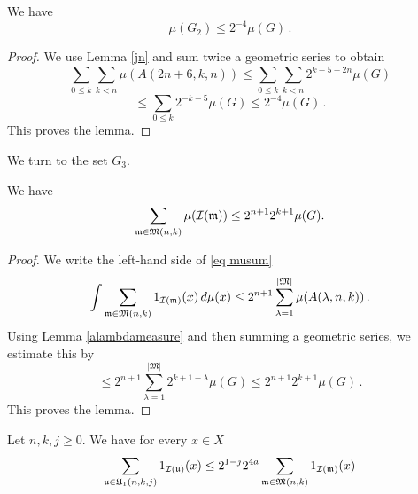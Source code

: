 \begin{lemma}\label{g2bound}
We have
\begin{equation}
    \mu(G_2)\le 2^{-4} \mu(G)\, .
\end{equation}
\end{lemma}
\begin{proof}

We use Lemma \ref{jn} and sum twice a geometric series
to obtain
\begin{equation}
    \sum_{0\le  k}\sum_{k< n}
\mu(A(2n+6,k,n))\le \sum_{0\le  k}\sum_{k< n} 2^{k-5-2n}\mu(G)
\end{equation}
\begin{equation}
    \le \sum_{0\le  k} 2^{-k-5}\mu(G)\le 2^{-4}\mu(G)\, .
\end{equation}
This proves the lemma.
\end{proof}


We turn to the set $G_3$.

\begin{lemma}\label{musumlemma}
    We have
    \begin{equation}\label{eq musum}
        \sum_{\mathfrak{m} \in \mathfrak{M}(n,k)} \mu(\sc(\mathfrak{m}))\le 2^{n+1}2^{k+1}\mu(G).
    \end{equation}
\end{lemma}
\begin{proof}
    We write the left-hand side of \ref{eq musum}
\begin{equation}
    \int \sum_{\mathfrak{m} \in \mathfrak{M}(n,k)} 1_{\sc(\mathfrak{m})}(x) \, d\mu(x) \le
2^{n+1} \sum_{\lambda=1}^{|\mathfrak{M}|}\mu(A(\lambda, n,k))\,.
\end{equation}
Using Lemma \ref{alambdameasure} and then summing a geometric series, we estimate this by
\begin{equation}
    \le
2^{n+1}\sum_{\lambda=1}^{|\mathfrak{M}|}
2^{k+1-\lambda}\mu(G)
\le
2^{n+1}2^{k+1}\mu(G)\, .
\end{equation}
This proves the lemma.
\end{proof}


\begin{lemma}\label{countu}
Let $n,k,j\ge 0$. We have for every $x\in X$
\begin{equation}
    \sum_{\fu\in \fU_1(n,k,j)} 1_{\sc(\fu)}(x)
    \le 2^{1-j}
    2^{4a} \sum_{\mathfrak{m}\in \mathfrak{M}(n,k)}
        1_{\sc(\mathfrak{m})}(x)
\end{equation}
\end{lemma}

